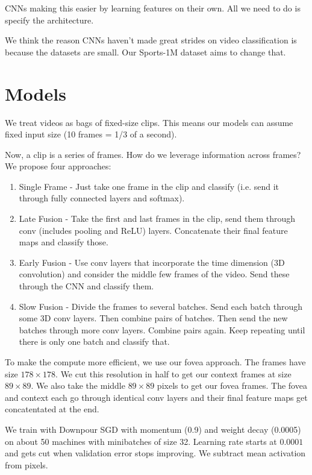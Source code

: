 \documentclass[a4paper]{article}
\begin{document}
CNNs making this easier by learning features on their own. All we need to do
is specify the architecture.

We think the reason CNNs haven't made great strides on video classification is
because the datasets are small. Our Sports-1M dataset aims to change that.

\section{Models}
We treat videos as bags of fixed-size clips. This means our models can
assume fixed input size (10 frames = 1/3 of a second).

Now, a clip is a series of frames. How do we leverage information across frames?
We propose four approaches:

\begin{enumerate}
  \item Single Frame - Just take one frame in the clip and classify (i.e. send
  it through fully connected layers and softmax).
  \item Late Fusion - Take the first and last frames in the clip, send them 
    through conv (includes pooling and ReLU) layers. Concatenate their 
    final feature maps and classify those.
  \item Early Fusion - Use conv layers that incorporate the time
  dimension (3D convolution) and consider the middle few frames of the video.
  Send these through the CNN and classify them.
  \item Slow Fusion - Divide the frames to several batches. Send each batch
  through some 3D conv layers. Then combine pairs of batches. Then send the
  new batches through more conv layers. Combine pairs again. Keep repeating
  until there is only one batch and classify that.
\end{enumerate}

To make the compute more efficient, we use our fovea approach. The frames
have size $178 \times 178$. We cut this resolution in half to get our
context frames at size $89 \times 89$. We also take the middle $89 \times 89$
pixels to get our fovea frames. The fovea and context each go through identical
conv layers and their final feature maps get concatentated at the end.

We train with Downpour SGD with momentum (0.9) and weight decay (0.0005)
on about 50 machines with minibatches of size 32. Learning rate starts at 
$0.0001$ and gets cut when validation error stops improving. We subtract
mean activation from pixels.
\end{document}
